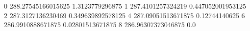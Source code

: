 0 288.27545166015625 1.3123779296875
1 287.4101257324219 0.447052001953125
2 287.3127136230469 0.349639892578125
4 287.09051513671875 0.12744140625
6 286.9910888671875 0.02801513671875
8 286.96307373046875 0.0
